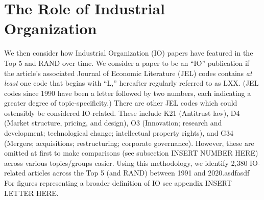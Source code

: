 \documentclass[11pt, letterpaper, twoside]{article}
\begin{document}
\section{The Role of Industrial Organization}
We then consider how Industrial Organization (IO) papers have featured in the Top 5 and RAND over time. We consider a paper to be an ``IO'' publication if the article's associated Journal of Economic Literature (JEL) codes contains \textit{at least} one code that begins with ``L,'' hereafter regularly referred to as LXX. (JEL codes since 1990 have been a letter followed by two numbers, each indicating a greater degree of topic-specificity.) There are other JEL codes which could ostensibly be considered IO-related. These include K21 (Antitrust law), D4 (Market structure, pricing, and design), O3 (Innovation; research and development; technological change; intellectual property rights), and G34 (Mergers; acquisitions; restructuring; corporate governance). However, these are omitted at first to make comparisons (see subsection INSERT NUMBER HERE) across various topics/groups easier. Using this methodology, we identify 2,380 IO-related articles across the Top 5 (and RAND) between 1991 and 2020.asdfasdf For figures representing a broader definition of IO see appendix INSERT LETTER HERE.\\
\end{document}
